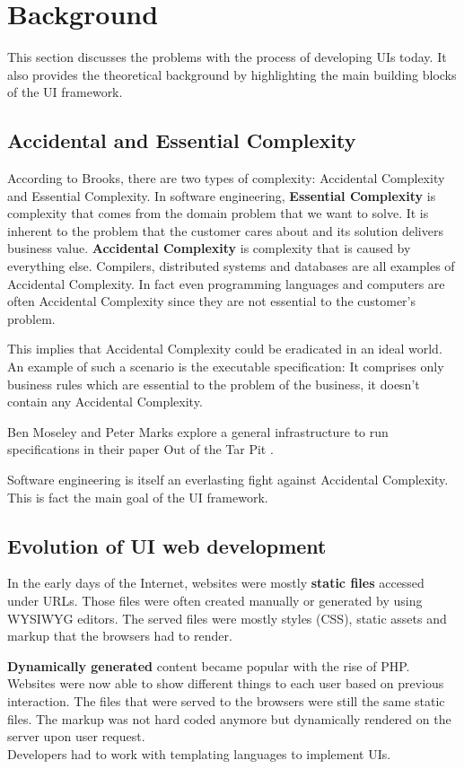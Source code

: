 \section{Background}\label{background}

This section discusses the problems with the process of developing UIs today. It also provides the theoretical background by highlighting the main building blocks of the UI framework.

\subsection{Accidental and Essential Complexity}
According to Brooks, there are two types of complexity: Accidental Complexity and Essential Complexity. \citep{nosilverbullet}
In software engineering, \textbf{Essential Complexity} is complexity that comes from the domain problem that we want to solve. It is inherent to the problem that the customer cares about and its solution delivers business value. \textbf{Accidental Complexity} is complexity that is caused by everything else. Compilers, distributed systems and databases are all examples of Accidental Complexity. In fact even programming languages and computers are often Accidental Complexity since they are not essential to the customer's problem.

This implies that Accidental Complexity could be eradicated in an ideal world. An example of such a scenario is the executable specification: It comprises only business rules which are essential to the problem of the business, it doesn't contain any Accidental Complexity.

Ben Moseley and Peter Marks explore a general infrastructure to run specifications in their paper Out of the Tar Pit \citep{outoftarpit}.

Software engineering is itself an everlasting fight against Accidental Complexity. This is fact the main goal of the UI framework.

\subsection{Evolution of UI web development}\label{history}
In the early days of the Internet, websites were mostly \textbf{static files} accessed under URLs. Those files were often created manually or generated by using \gls{WYSIWYG} editors. The served files were mostly styles (CSS), static assets and markup that the browsers had to render.

\textbf{Dynamically generated} content became popular with the rise of PHP. Websites were now able to show different things to each user based on previous interaction. The files that were served to the browsers were still the same static files. The markup was not hard coded anymore but dynamically rendered on the server upon user request.
\\ Developers had to work with templating languages to implement UIs.

